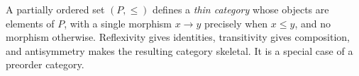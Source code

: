 
A partially ordered set $(P,\le)$ defines a \emph{thin category} whose objects are elements of $P$, with a single morphism $x\to y$ precisely when $x\le y$, and no morphism otherwise. Reflexivity gives identities, transitivity gives composition, and antisymmetry makes the resulting category skeletal. It is a special case of a preorder category.
